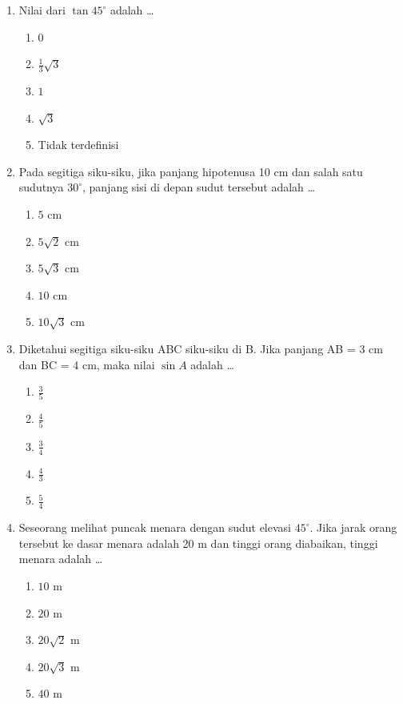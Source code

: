 \documentclass[12pt,a4paper]{article}
\begin{document}
\begin{enumerate}[leftmargin=*]
\item Nilai dari $\tan 45^\circ$ adalah \dots
    \begin{enumerate}[label=\alph*.]
        \item $0$
        \item $\frac{1}{3}\sqrt{3}$
        \item $1$
        \item $\sqrt{3}$
        \item Tidak terdefinisi
    \end{enumerate}

\item Pada segitiga siku-siku, jika panjang hipotenusa 10 cm dan salah satu sudutnya $30^\circ$, panjang sisi di depan sudut tersebut adalah \dots
    \begin{enumerate}[label=\alph*.]
        \item $5$ cm
        \item $5\sqrt{2}$ cm
        \item $5\sqrt{3}$ cm
        \item $10$ cm
        \item $10\sqrt{3}$ cm
    \end{enumerate}

\item Diketahui segitiga siku-siku ABC siku-siku di B. Jika panjang AB = 3 cm dan BC = 4 cm, maka nilai $\sin A$ adalah \dots
    \begin{enumerate}[label=\alph*.]
        \item $\frac{3}{5}$
        \item $\frac{4}{5}$
        \item $\frac{3}{4}$
        \item $\frac{4}{3}$
        \item $\frac{5}{4}$
    \end{enumerate}

\item Seseorang melihat puncak menara dengan sudut elevasi $45^\circ$. Jika jarak orang tersebut ke dasar menara adalah 20 m dan tinggi orang diabaikan, tinggi menara adalah \dots
    \begin{enumerate}[label=\alph*.]
        \item $10$ m
        \item $20$ m
        \item $20\sqrt{2}$ m
        \item $20\sqrt{3}$ m
        \item $40$ m
    \end{enumerate}


\end{enumerate}
\end{document}
